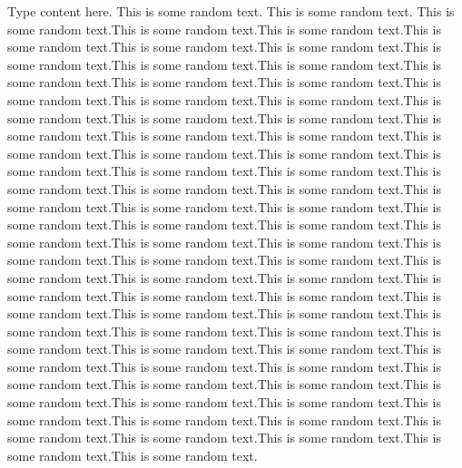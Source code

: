 Type content here. This is some random text. This is some random text. This is some random text.This is some random text.This is some random text.This is some random text.This is some random text.This is some random text.This is some random text.This is some random text.This is some random text.This is some random text.This is some random text.This is some random text.This is some random text.This is some random text.This is some random text.This is some random text.This is some random text.This is some random text.This is some random text.This is some random text.This is some random text.This is some random text.This is some random text.This is some random text.This is some random text.This is some random text.This is some random text.This is some random text.This is some random text.This is some random text.This is some random text.This is some random text.This is some random text.This is some random text.This is some random text.This is some random text.This is some random text.This is some random text.This is some random text.This is some random text.This is some random text.This is some random text.This is some random text.This is some random text.This is some random text.This is some random text.This is some random text.This is some random text.This is some random text.This is some random text.This is some random text.This is some random text.This is some random text.This is some random text.This is some random text.This is some random text.This is some random text.This is some random text.This is some random text.This is some random text.This is some random text.This is some random text.This is some random text.This is some random text.This is some random text.This is some random text.This is some random text.This is some random text.This is some random text.This is some random text.This is some random text.This is some random text.This is some random text.This is some random text.

